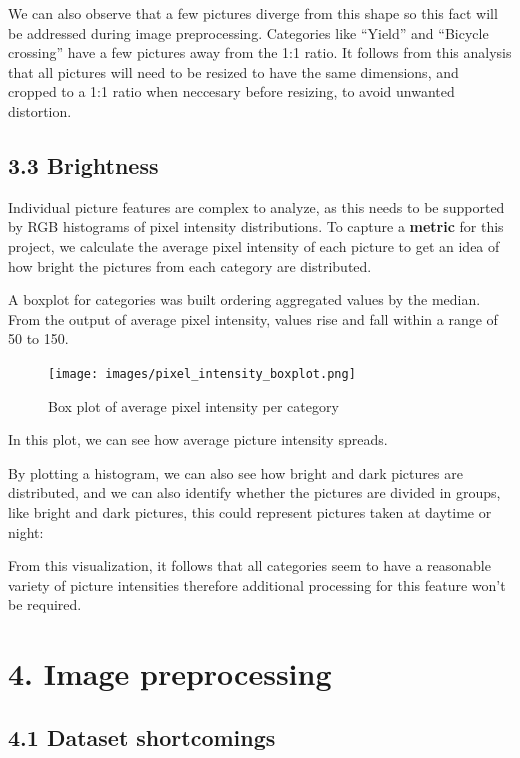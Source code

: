 \documentclass[
  11pt,
]{article}
\begin{document}
We can also observe that a few pictures diverge from this shape so this
fact will be addressed during image preprocessing. Categories like
``Yield'' and ``Bicycle crossing'' have a few pictures away from the 1:1
ratio. It follows from this analysis that all pictures will need to be
resized to have the same dimensions, and cropped to a 1:1 ratio when
neccesary before resizing, to avoid unwanted distortion.

\hypertarget{brightness}{%
\subsection{3.3 Brightness}\label{brightness}}

Individual picture features are complex to analyze, as this needs to be
supported by RGB histograms of pixel intensity distributions. To capture
a \textbf{metric} for this project, we calculate the average pixel
intensity of each picture to get an idea of how bright the pictures from
each category are distributed.

A boxplot for categories was built ordering aggregated values by the
median. From the output of average pixel intensity, values rise and fall
within a range of 50 to 150.

\begin{figure}
\centering
\texttt{[image: images/pixel\_intensity\_boxplot.png]}
\caption{Box plot of average pixel intensity per category}
\end{figure}

In this plot, we can see how average picture intensity spreads.

By plotting a histogram, we can also see how bright and dark pictures
are distributed, and we can also identify whether the pictures are
divided in groups, like bright and dark pictures, this could represent
pictures taken at daytime or night:

From this visualization, it follows that all categories seem to have a
reasonable variety of picture intensities therefore additional
processing for this feature won't be required.

\pagebreak

\hypertarget{image-preprocessing}{%
\section{4. Image preprocessing}\label{image-preprocessing}}

\hypertarget{dataset-shortcomings}{%
\subsection{4.1 Dataset shortcomings}\label{dataset-shortcomings}}
\end{document}
